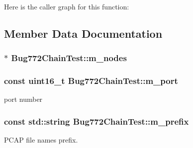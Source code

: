 Here is the caller graph for this function\+:




\subsection{Member Data Documentation}
\subsubsection[{\texorpdfstring{m\+\_\+nodes}{m_nodes}}]{$\ast$ Bug772\+Chain\+Test\+::m\+\_\+nodes\hspace{0.3cm}{\ttfamily [private]}}\hypertarget{classBug772ChainTest_a516c0c86192d926b8277fd3ed0e7f112}{}\label{classBug772ChainTest_a516c0c86192d926b8277fd3ed0e7f112}
\subsubsection[{\texorpdfstring{m\+\_\+port}{m_port}}]{\setlength{\rightskip}{0pt plus 5cm}const uint16\+\_\+t Bug772\+Chain\+Test\+::m\+\_\+port\hspace{0.3cm}{\ttfamily [private]}}\hypertarget{classBug772ChainTest_a32f57f5fa12f89ab99561d458f430acb}{}\label{classBug772ChainTest_a32f57f5fa12f89ab99561d458f430acb}


port number 

\subsubsection[{\texorpdfstring{m\+\_\+prefix}{m_prefix}}]{\setlength{\rightskip}{0pt plus 5cm}const std\+::string Bug772\+Chain\+Test\+::m\+\_\+prefix\hspace{0.3cm}{\ttfamily [private]}}\hypertarget{classBug772ChainTest_a8008aa030717e255183ef4337d1e3f27}{}\label{classBug772ChainTest_a8008aa030717e255183ef4337d1e3f27}


P\+C\+AP file names prefix. 

